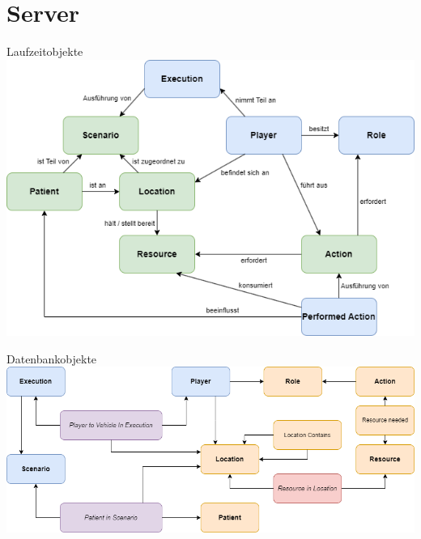 %
%
\section{Server}

\begin{frame}{Laufzeitobjekte}
	\centering
	\includegraphics[height=.86\textheight]{images/server_laufzeit_objekte.png}
\end{frame}

\begin{frame}{Datenbankobjekte}
	\centering
	\includegraphics[width=\textwidth]{images/server_datenbank_objekte.png}
\end{frame}
